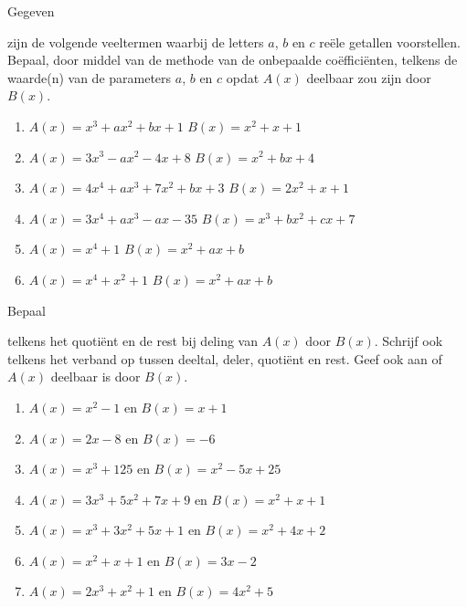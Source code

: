 \documentclass{ximera}
\begin{document}
\begin{exercise} 
\hypertarget{oef2.9}{Gegeven} zijn de volgende veeltermen waarbij de letters $a$, $b$ en $c$ re\"ele getallen voorstellen. Bepaal, door middel van de methode van de onbepaalde co\"effici\"enten, telkens de waarde(n) van de parameters $a$, $b$ en $c$ opdat $A(x)$ deelbaar zou zijn door $B(x)$. 
\begin{enumerate}
\item
$A(x) = x^3 + ax^2 + bx + 1$ \quad {} \quad $B(x) = x^2 + x + 1$
\item
$A(x) = 3x^3 - ax^2 - 4x + 8$ \quad {} \quad $B(x) = x^2 + bx + 4$
\item
$A(x) = 4x^4 + ax^3 + 7x^2 + bx + 3$ \quad {} \quad $B(x) = 2x^2 + x + 1$
\item
$A(x) = 3x^4 + ax^3 -ax - 35$ \quad {} \quad $B(x) = x^3 + bx^2 + cx + 7$
\item %
$A(x) = x^4+1$ \quad {} \quad $B(x) = x^2+ax+b$
\item %
$A(x) = x^4+x^2+1$ \quad {} \quad $B(x) = x^2+ax+b$
\end{enumerate}
\end{exercise} 

\begin{exercise} 
\hypertarget{oef2.10}{Bepaal} telkens het quoti\"ent en de rest bij deling van $A(x)$ door $B(x)$. Schrijf ook telkens het verband op tussen deeltal, deler, quoti\"ent en rest. Geef ook aan of $A(x)$ deelbaar is door $B(x)$.
\begin{enumerate}
\item
$A(x) = x^2-1$ \quad en \quad $B(x) = x+1$
\item
$A(x) = 2x-8$ \quad en \quad $B(x) = -6$
\item
$A(x) = x^3 +125$ \quad en \quad $B(x) = x^2 - 5x + 25$ 
\item
$A(x) = 3x^3 + 5x^2 + 7x + 9$ \quad en \quad $B(x) = x^2 + x + 1$ 
\item
$A(x) = x^3 + 3x^2 + 5x + 1$ \quad en \quad $B(x) = x^2 + 4x + 2$ 
\item
$A(x) = x^2+x+1$ en $B(x) = 3x-2$ 
\item
$A(x) = 2x^3 + x^2 + 1$ en $B(x) = 4x^2 + 5$ 
\end{enumerate}
\end{exercise} 
\end{document}
